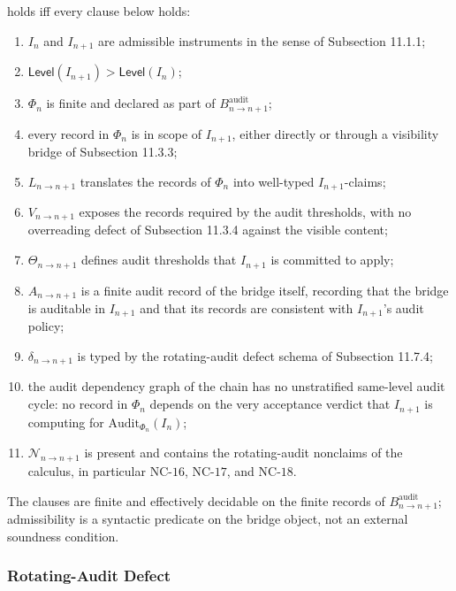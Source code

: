 \documentclass[11pt]{article}
\providecommand{\tightlist}{}
\theoremstyle{definition}
\begin{document}
holds iff every clause below holds:

\begin{enumerate}
\def\labelenumi{\arabic{enumi}.}
\tightlist
\item
  \(I_n\) and \(I_{n+1}\) are admissible instruments in the sense of Subsection 11.1.1;
\item
  \(\mathsf{Level}(I_{n+1})>\mathsf{Level}(I_n)\);
\item
  \(\Phi_n\) is finite and declared as part of \(B^{\mathrm{audit}}_{n\to n+1}\);
\item
  every record in \(\Phi_n\) is in scope of \(I_{n+1}\), either directly or through a visibility bridge of Subsection 11.3.3;
\item
  \(L_{n\to n+1}\) translates the records of \(\Phi_n\) into well-typed \(I_{n+1}\)-claims;
\item
  \(V_{n\to n+1}\) exposes the records required by the audit thresholds, with no overreading defect of Subsection 11.3.4 against the visible content;
\item
  \(\Theta_{n\to n+1}\) defines audit thresholds that \(I_{n+1}\) is committed to apply;
\item
  \(A_{n\to n+1}\) is a finite audit record of the bridge itself, recording that the bridge is auditable in \(I_{n+1}\) and that its records are consistent with \(I_{n+1}\)'s audit policy;
\item
  \(\delta_{n\to n+1}\) is typed by the rotating-audit defect schema of Subsection 11.7.4;
\item
  the audit dependency graph of the chain has no unstratified same-level audit cycle: no record in \(\Phi_n\) depends on the very acceptance verdict that \(I_{n+1}\) is computing for \(\mathrm{Audit}_{\Phi_n}(I_n)\);
\item
  \(\mathcal N_{n\to n+1}\) is present and contains the rotating-audit nonclaims of the calculus, in particular \(\mathrm{NC}\text{-}16\), \(\mathrm{NC}\text{-}17\), and \(\mathrm{NC}\text{-}18\).
\end{enumerate}

The clauses are finite and effectively decidable on the finite records of \(B^{\mathrm{audit}}_{n\to n+1}\); admissibility is a syntactic predicate on the bridge object, not an external soundness condition.

\subsubsection{Rotating-Audit Defect}
\end{document}
